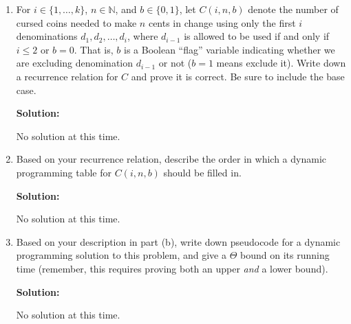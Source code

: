 \documentclass[12pt]{article}
\begin{document}
\begin{enumerate}
    \begin{enumerate}
        \item For $i \in \{1,\dotsc,k\}$, $n \in \mathbb{N}$, and $b \in \{0,1\}$, let $C(i,n,b)$ denote the number of 
        cursed coins needed to make $n$ cents in change using only the first $i$ denominations $d_1, d_2, \dotsc, d_i$, where 
        $d_{i-1}$ is allowed to be used if and only if $i \leq 2$ or $b=0$. That is, $b$ is a Boolean ``flag'' variable 
        indicating whether we are excluding denomination $d_{i-1}$ or not ($b=1$ means exclude it). 	
        Write down a recurrence relation for $C$ and prove it is correct. Be sure to include the base case.\par
        \textbf{Solution:}\par
        No solution at this time.
        \item Based on your recurrence relation, describe the order in which a dynamic programming table for $C(i,n,b)$ 
        should be filled in.\par
        \textbf{Solution:}\par
        No solution at this time.
        \item Based on your description in part (b), write down pseudocode for a dynamic programming solution to this problem, 
        and give a $\Theta$ bound on its running time (remember, this requires proving both an upper \emph{and} a lower bound).\par
        \textbf{Solution:}\par
        No solution at this time.
    \end{enumerate}

\end{enumerate}
\end{document}

